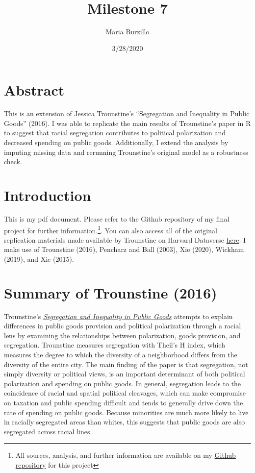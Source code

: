 \documentclass[]{article}
\title{Milestone 7}
\author{Maria Burzillo}
\date{3/28/2020}
\begin{document}
\maketitle

\hypertarget{abstract}{%
\section{Abstract}\label{abstract}}

This is an extension of Jessica Trounstine's ``Segregation and
Inequality in Public Goods'' (2016). I was able to replicate the main
results of Trounstine's paper in R to suggest that racial segregation
contributes to political polarization and decreased spending on public
goods. Additionally, I extend the analysis by imputing missing data and
rerunning Trounstine's original model as a robustness check.

\hypertarget{introduction}{%
\section{Introduction}\label{introduction}}

This is my pdf document. Please refer to the Github repository of my
final project for further information.\footnote{All sources, analysis,
  and further information are available on my
  \href{https://github.com/mburzillo/Final-Project-Final-Version}{Github
  repository} for this project}. You can also access all of the original
replication materials made available by Trounstine on Harvard Dataverse
\href{https://dataverse.harvard.edu/dataset.xhtml?persistentId=doi:10.7910/DVN/4LZXTY\&version=1.2}{here}.
I make use of Trounstine (2016), Pencharz and Ball (2003), Xie (2020),
Wickham (2019), and Xie (2015).

\hypertarget{summary-of-trounstine-2016}{%
\section{Summary of Trounstine
(2016)}\label{summary-of-trounstine-2016}}

Trounstine's
\href{https://onlinelibrary.wiley.com/doi/abs/10.1111/ajps.12227}{\emph{Segregation
and Inequality in Public Goods}} attempts to explain differences in
public goods provision and political polarization through a racial lens
by examining the relationships between polarization, goods provision,
and segregation. Trounstine measures segregation with Theil's H index,
which measures the degree to which the diversity of a neighborhood
differs from the diversity of the entire city. The main finding of the
paper is that segregation, not simply diversity or political views, is
an important determinant of both political polarization and spending on
public goods. In general, segregation leads to the coincidence of racial
and spatial political cleavages, which can make compromise on taxation
and public spending difficult and tends to generally drive down the rate
of spending on public goods. Because minorities are much more likely to
live in racially segregated areas than whites, this suggests that public
goods are also segregated across racial lines.
\end{document}
